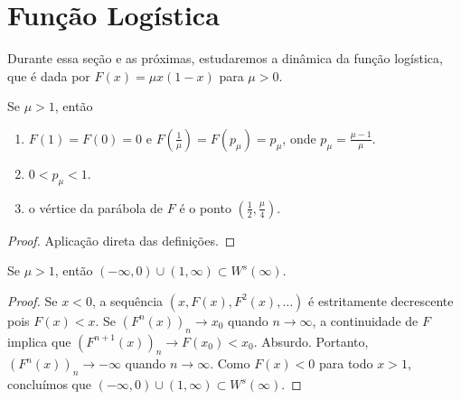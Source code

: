 \section{Função Logística}


Durante essa seção e as próximas, estudaremos a dinâmica da função logística, que é dada por $F(x) = \mu x(1-x)$ para $\mu > 0$.

\begin{proposition}
Se $\mu > 1$, então
\begin{enumerate}
\item $F (1) = F(0) = 0$ e $F(\frac{1}{\mu}) = F(p_\mu) = p_\mu$, onde $p_\mu = \frac{\mu - 1}{\mu}$.
\item $0 < p_\mu < 1$.
\item o vértice da parábola de $F$ é o ponto $(\frac{1}{2}, \frac{\mu}{4})$.
\end{enumerate}
\end{proposition}

\begin{proof}
Aplicação direta das definições.
\end{proof}

\begin{proposition}
\label{proposicao estudoinicial 1}
Se $\mu > 1$, então $(-\infty, 0) \cup (1, \infty) \subset W^s(\infty)$.
\end{proposition}

\begin{proof}
Se $x < 0$, a sequência  $(x, F(x), F^2(x), \dots)$ é estritamente decrescente pois  $F(x) < x$. Se $(F^n(x))_n \to x_0$ quando $n \to \infty$, a continuidade de $F$ implica que $(F^{n+1}(x))_n \to F (x_0) < x_0$. Absurdo. Portanto, $(F^n(x))_n \to -\infty$ quando $n \to \infty$. Como $F(x) < 0$ para todo $x > 1$, concluímos que $(-\infty, 0) \cup (1, \infty) \subset W^s(\infty)$.
\end{proof}


